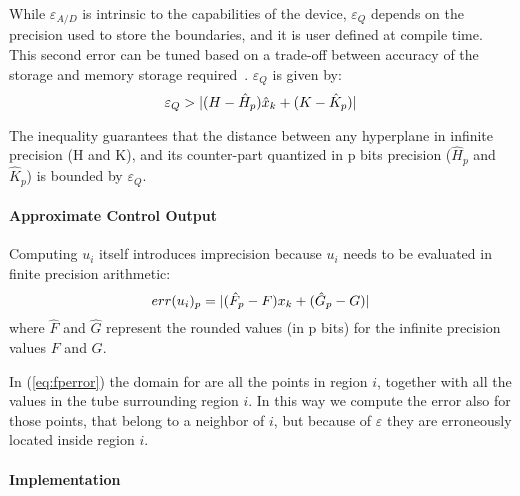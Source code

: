 
While $\varepsilon_{A/D}$ is intrinsic to the capabilities of the device,
$\varepsilon_{Q}$ depends on the precision used to store the boundaries, and it is user defined at compile time. This
second error can be tuned based on a trade-off between accuracy of the storage and
memory storage required~\cite{memoryMPC}.
%
$\varepsilon_{Q}$ is given by:
\begin{equation}\label{eq:quantizationlines}
  \varepsilon_{Q} > |(H-\hat{H}_{p})\hat{x}_{k}+(K-\hat{K}_{p})|
\end{equation}

The inequality guarantees that the distance between any hyperplane in infinite precision (H and K), and its counter-part quantized in p bits precision ($\hat{H}_{p}$ and $\hat{K}_{p}$) is bounded by $\varepsilon_{Q}$.


\paragraph{Approximate Control Output}

Computing $u_{i}$ itself introduces imprecision because $u_i$ needs to be evaluated 
in finite precision arithmetic:
\begin{equation}\label{eq:fperror}
  err(u_{i})_{p}=|(\hat{F}_{p}-F)x_{k}+(\hat{G}_{p}-G)|
\end{equation}
where $\hat{F}$ and $\hat{G}$ represent the rounded values (in p bits) for the infinite precision values $F$ and $G$.

In (\ref{eq:fperror}) the domain for \statevarmath are all the points in region $i$, together with all the values in the tube surrounding region $i$. 
In this way we compute the error also for those points, that belong to a neighbor of $i$, but because of $\varepsilon$ they are erroneously located inside region $i$.

\paragraph{Implementation}

